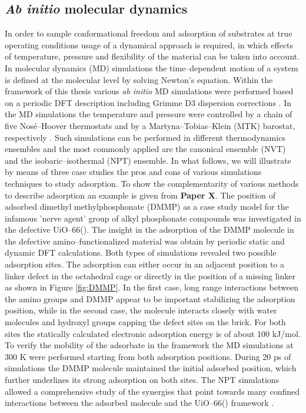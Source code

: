 \subsection*{\textit{Ab initio} molecular dynamics}
In order to sample conformational freedom and adsorption of substrates at true
operating conditions usage of a dynamical approach is required, in which effects
of temperature, pressure and flexibility of the material can be taken into account.
In molecular dynamics (MD) simulations the time--dependent motion of a system is defined at the molecular
level by solving Newton's equation. Within the framework of this thesis various
\textit{ab initio} MD simulations were performed based on a periodic DFT
description including Grimme D3 dispersion corrections \cite{Grimme2010}. In the
MD simulations the temperature and pressure were controlled by a chain of five
Nos\'e--Hoover thermostats and by a Martyna--Tobias--Klein (MTK) barostat,
respectively \cite{Frenkel2002, Martyna1994}. Such simulations can be performed in different thermodynamics ensembles and the most commonly applied are the canonical ensemble (NVT) and the isobaric--isothermal (NPT) ensemble. In what follows, we will illustrate by means of three case studies the pros and cons of various simulations techniques to study adsorption.
\npar
To show the complementarity of various methods to describe adsorption an example
is given from \textbf{Paper X}. The position of adsorbed dimethyl
methylphosphonate (DMMP) as a case study model for the infamous 'nerve agent'
group of alkyl phosphonate compounds was investigated in the defective
UiO--66(). The insight in the adsorption of the DMMP molecule in the defective amino--functionalized material was obtain by periodic static and dynamic DFT calculations. Both types of simulations revealed two possible
adsorption sites. The adsorption can either occur in an adjacent position to a
linker defect in the octahedral cage or directly in the position of a missing
linker as shown in Figure \ref{fig:DMMP}. In the first case, long range
interactions between the amino groups and DMMP appear to be important stabilizing the adsorption
position, while in the second case, the molecule interacts closely with
water molecules and hydroxyl groups capping the defect sites on the brick.
For both sites the statically calculated electronic adsorption energy is 
of about 100 kJ/mol. To verify the mobility of the adsorbate in the framework
the MD simulations at 300 K were performed starting from both adsorption
positions. During 20 ps of simulations the DMMP molecule maintained the
initial adsorbed position, which further underlines its strong adsorption on both sites.
The NPT simulations allowed a 
comprehensive study of the synergies that point towards many confined
interactions between the adsorbed molecule and the
UiO--66() framework \cite{Stassen2016}.

